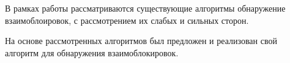  
В рамках работы рассматриваются существующие алгоритмы обнаружение взаимоблоировок, с рассмотрением их слабых и сильных сторон. 

На основе рассмотренных алгоритмов был предложен и реализован свой алгоритм для обнаружения взаимоблокировок.

\clearpage